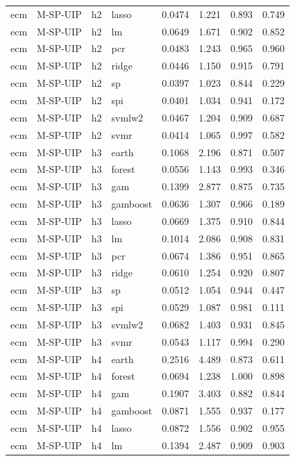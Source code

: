 \begin{ThreePartTable}
\begin{longtable}[t]{llclcccc}
ecm & M-SP-UIP & h2 & lasso & 0.0474 & 1.221 & 0.893 & 0.749\\
ecm & M-SP-UIP & h2 & lm & 0.0649 & 1.671 & 0.902 & 0.852\\
ecm & M-SP-UIP & h2 & pcr & 0.0483 & 1.243 & 0.965 & 0.960\\
ecm & M-SP-UIP & h2 & ridge & 0.0446 & 1.150 & 0.915 & 0.791\\
ecm & M-SP-UIP & h2 & sp & 0.0397 & 1.023 & 0.844 & 0.229\\
ecm & M-SP-UIP & h2 & spi & 0.0401 & 1.034 & 0.941 & 0.172\\
ecm & M-SP-UIP & h2 & svmlw2 & 0.0467 & 1.204 & 0.909 & 0.687\\
ecm & M-SP-UIP & h2 & svmr & 0.0414 & 1.065 & 0.997 & 0.582\\
\addlinespace
ecm & M-SP-UIP & h3 & earth & 0.1068 & 2.196 & 0.871 & 0.507\\
ecm & M-SP-UIP & h3 & forest & 0.0556 & 1.143 & 0.993 & 0.346\\
ecm & M-SP-UIP & h3 & gam & 0.1399 & 2.877 & 0.875 & 0.735\\
ecm & M-SP-UIP & h3 & gamboost & 0.0636 & 1.307 & 0.966 & 0.189\\
ecm & M-SP-UIP & h3 & lasso & 0.0669 & 1.375 & 0.910 & 0.844\\
ecm & M-SP-UIP & h3 & lm & 0.1014 & 2.086 & 0.908 & 0.831\\
ecm & M-SP-UIP & h3 & pcr & 0.0674 & 1.386 & 0.951 & 0.865\\
ecm & M-SP-UIP & h3 & ridge & 0.0610 & 1.254 & 0.920 & 0.807\\
ecm & M-SP-UIP & h3 & sp & 0.0512 & 1.054 & 0.944 & 0.447\\
ecm & M-SP-UIP & h3 & spi & 0.0529 & 1.087 & 0.981 & 0.111\\
ecm & M-SP-UIP & h3 & svmlw2 & 0.0682 & 1.403 & 0.931 & 0.845\\
ecm & M-SP-UIP & h3 & svmr & 0.0543 & 1.117 & 0.994 & 0.290\\
\addlinespace
ecm & M-SP-UIP & h4 & earth & 0.2516 & 4.489 & 0.873 & 0.611\\
ecm & M-SP-UIP & h4 & forest & 0.0694 & 1.238 & 1.000 & 0.898\\
ecm & M-SP-UIP & h4 & gam & 0.1907 & 3.403 & 0.882 & 0.844\\
ecm & M-SP-UIP & h4 & gamboost & 0.0871 & 1.555 & 0.937 & 0.177\\
ecm & M-SP-UIP & h4 & lasso & 0.0872 & 1.556 & 0.902 & 0.955\\
ecm & M-SP-UIP & h4 & lm & 0.1394 & 2.487 & 0.909 & 0.903\\

\end{longtable}
\end{ThreePartTable}
